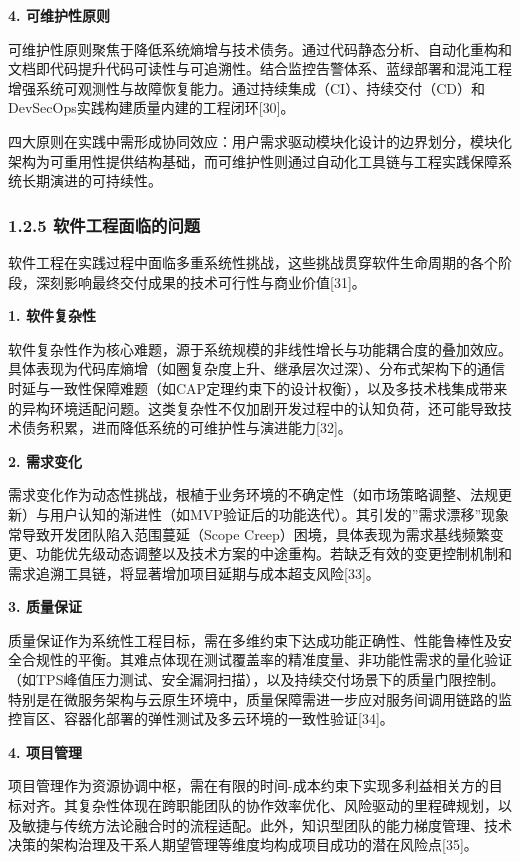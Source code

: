 \textbf{4. 可维护性原则}

可维护性原则聚焦于降低系统熵增与技术债务。通过代码静态分析、自动化重构和文档即代码提升代码可读性与可追溯性。结合监控告警体系、蓝绿部署和混沌工程增强系统可观测性与故障恢复能力。通过持续集成（CI）、持续交付（CD）和DevSecOps实践构建质量内建的工程闭环{[}30{]}。

四大原则在实践中需形成协同效应：用户需求驱动模块化设计的边界划分，模块化架构为可重用性提供结构基础，而可维护性则通过自动化工具链与工程实践保障系统长期演进的可持续性。

\subsubsection{1.2.5 软件工程面临的问题}\label{ux8f6fux4ef6ux5de5ux7a0bux9762ux4e34ux7684ux95eeux9898}

软件工程在实践过程中面临多重系统性挑战，这些挑战贯穿软件生命周期的各个阶段，深刻影响最终交付成果的技术可行性与商业价值{[}31{]}。

\textbf{1. 软件复杂性}

软件复杂性作为核心难题，源于系统规模的非线性增长与功能耦合度的叠加效应。具体表现为代码库熵增（如圈复杂度上升、继承层次过深）、分布式架构下的通信时延与一致性保障难题（如CAP定理约束下的设计权衡），以及多技术栈集成带来的异构环境适配问题。这类复杂性不仅加剧开发过程中的认知负荷，还可能导致技术债务积累，进而降低系统的可维护性与演进能力{[}32{]}。

\textbf{2. 需求变化}

需求变化作为动态性挑战，根植于业务环境的不确定性（如市场策略调整、法规更新）与用户认知的渐进性（如MVP验证后的功能迭代）。其引发的''需求漂移''现象常导致开发团队陷入范围蔓延（Scope Creep）困境，具体表现为需求基线频繁变更、功能优先级动态调整以及技术方案的中途重构。若缺乏有效的变更控制机制和需求追溯工具链，将显著增加项目延期与成本超支风险{[}33{]}。

\textbf{3. 质量保证}

质量保证作为系统性工程目标，需在多维约束下达成功能正确性、性能鲁棒性及安全合规性的平衡。其难点体现在测试覆盖率的精准度量、非功能性需求的量化验证（如TPS峰值压力测试、安全漏洞扫描），以及持续交付场景下的质量门限控制。特别是在微服务架构与云原生环境中，质量保障需进一步应对服务间调用链路的监控盲区、容器化部署的弹性测试及多云环境的一致性验证{[}34{]}。

\textbf{4. 项目管理}

项目管理作为资源协调中枢，需在有限的时间-成本约束下实现多利益相关方的目标对齐。其复杂性体现在跨职能团队的协作效率优化、风险驱动的里程碑规划，以及敏捷与传统方法论融合时的流程适配。此外，知识型团队的能力梯度管理、技术决策的架构治理及干系人期望管理等维度均构成项目成功的潜在风险点{[}35{]}。

